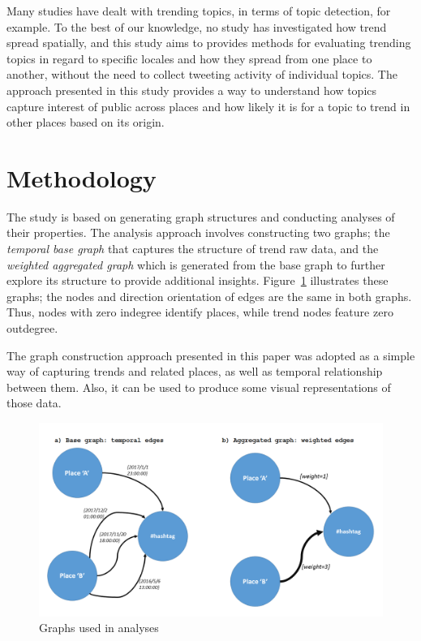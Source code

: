 \documentclass{llncs}
\begin{document}
Many studies have dealt with trending topics, in terms of topic detection, 
for example. To the best of our knowledge, no study has investigated 
how trend spread spatially, and this study aims to provides methods for 
evaluating trending topics in regard to specific locales and how they spread 
from one place to another, without the need to collect tweeting activity of individual topics.
The approach presented in this study provides a way to understand how 
topics capture interest of public across places and how likely it is for a 
topic to trend in other places based on its origin. 

\section{Methodology}\label{method}

The study is based on generating graph structures and conducting
analyses of their properties. The analysis approach involves
constructing two graphs; the {\emph{temporal base graph}} that
captures the structure of trend raw data, and the {\emph{weighted
aggregated graph}} which is generated from the base graph to further
explore its structure to provide additional
insights. Figure~\ref{fig:graphexamples} illustrates these graphs; the
nodes and direction orientation of edges are the same in both
graphs. Thus, nodes with zero indegree identify places, while trend
nodes feature zero outdegree.

The graph construction approach presented in this paper was adopted
as a simple way of capturing trends and related places,
as well as temporal relationship between them. Also, it can be used to
produce some visual representations of those data.

\begin{figure}[!htb] \centering
\includegraphics[width=\columnwidth]{images/graphexamples.png}
\caption{Graphs used in analyses}
\label{fig:graphexamples}
\end{figure}
\end{document}
